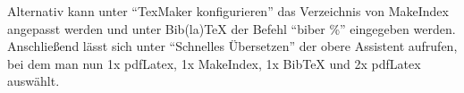Alternativ kann unter \enquote{TexMaker konfigurieren} das Verzeichnis von MakeIndex angepasst werden und unter Bib(la)TeX der Befehl \enquote{biber \%} eingegeben werden. 
Anschließend lässt sich unter \enquote{Schnelles Übersetzen} der obere Assistent aufrufen, bei dem man nun 1x pdfLatex, 1x MakeIndex, 1x BibTeX und 2x pdfLatex auswählt. 